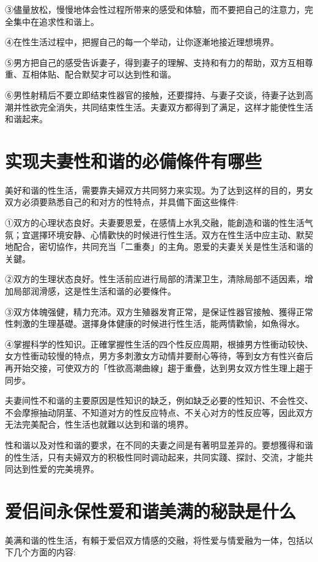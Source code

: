 \documentclass[12pt,UTF8]{ctexbook}
\begin{document}
③儘量放松，慢慢地体会性过程所带来的感受和体驗，而不要把自己的注意力，完全集中在追求性和谐上。

④在性生活过程中，把握自己的每一个举动，让你逐漸地接近理想境界。

⑤男方把自己的感受告诉妻子，得到妻子的理解、支持和有力的帮助，双方互相尊重、互相体贴、配合默契才可以达到性和谐。

⑥男性射精后不要立即结束性器官的接触，还要撐持、与妻子交谈，待妻子达到高潮并性欲完全消失，共同结束性生活。夫妻双方都得到了满足，这样才能使性生活和谐起来。

\section{实现夫妻性和谐的必備條件有哪些}

美好和谐的性生活，需要靠夫婦双方共同努力来实现。为了达到这样的目的，男女双方必須要熟悉自己的和对方的性特点，并具備下面这些條件:

①双方的心理状态良好。夫妻要恩爱，在感情上水乳交融，能創造和谐的性生活气氛；宜選擇环境安静、心情歡快的时候进行性生活。双方在性生活中应主动、默契地配合，密切協作，共同充当「二重奏」的主角。恩爱的夫妻关关是性生活和谐的关鍵。

②双方的生理状态良好。性生活前应进行局部的清潔卫生，清除局部不适因素，增加局部润滑感，这是性生活和谐的必要條件。

③双方体魄强健，精力充沛。双方生殖器发育正常，是保证性器官接触、獲得正常性刺激的生理基礎。選擇身体健康的时候进行性生活，能两情歡愉，如魚得水。

④掌握科学的性知识。正確掌握性生活的四个性反应周期，根據男方性衝动较快、女方性衝动较慢的特点，男方多刺激女方动情并要耐心等待，等到女方有性兴奋后再开始交接，可使双方的「性欲高潮曲線」趨于重疊，达到男女双方性生理上趨于同步。

夫妻间性不和谐的主要原因是性知识的缺乏，例如缺乏必要的性知识、不会性交、不会摩擦抽动阴茎、不知道对方的性反应特点、不关心对方的性反应等，因此双方无法完美配合，性生活也就難以达到和谐的境界。

性和谐以及对性和谐的要求，在不同的夫妻之间是有著明显差异的。要想獲得和谐的性生活，只有夫婦双方的积极性同时调动起来，共同实踐、探討、交流，才能共同达到性爱的完美境界。

\section{爱侣间永保性爱和谐美满的秘訣是什么}

美满和谐的性生活，有賴于爱侣双方情感的交融，将性爱与情爱融为一体，包括以下几个方面的内容:
\end{document}
